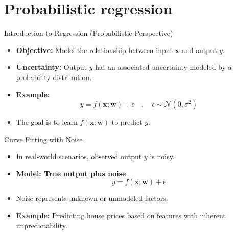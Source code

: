 \documentclass[serif, aspectratio=169]{beamer}
\begin{document}

\section{Probabilistic regression}
\begin{frame}{Introduction to Regression (Probabilistic Perspective)}
    \begin{itemize}
        \item \textbf{Objective:} Model the relationship between input \( \mathbf{x} \) and output \( y \).
        \item \textbf{Uncertainty:} Output \( y \) has an associated uncertainty modeled by a probability distribution.
        \item \textbf{Example:}
        \[
        y = f(\mathbf{x}; \mathbf{w}) + \epsilon \quad , \quad \epsilon \sim \mathcal{N}(0, \sigma^2)
        \]
        \item The goal is to learn \( f(\mathbf{x}; \mathbf{w}) \) to predict \( y \).
    \end{itemize}
\end{frame}

\begin{frame}{Curve Fitting with Noise}
    \begin{itemize}
        \item In real-world scenarios, observed output \( y \) is noisy.
        \item \textbf{Model: True output plus noise}
        \[
        y = f(\mathbf{x}; \mathbf{w}) + \epsilon
        \]
        \item Noise represents unknown or unmodeled factors.
        \item \textbf{Example:} Predicting house prices based on features with inherent unpredictability.
    \end{itemize}
\end{frame}
\end{document}
